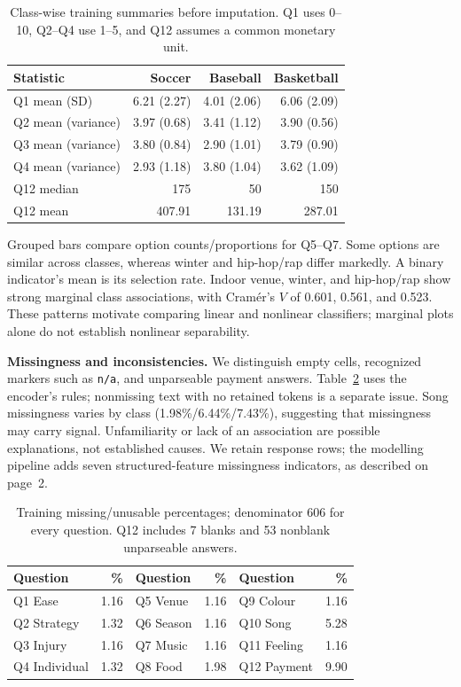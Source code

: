 \documentclass[10pt,letterpaper]{article}
\newcommand{\topic}[1]{\par\smallskip\textbf{#1}\quad}
\begin{document}
\begin{table}[ht]
\centering\small
\caption{Class-wise training summaries before imputation. Q1 uses 0--10,
Q2--Q4 use 1--5, and Q12 assumes a common monetary unit.}
\label{tab:numeric}
\begin{tabular}{lrrr}
\toprule
Statistic & Soccer & Baseball & Basketball\\
\midrule
Q1 mean (SD) & 6.21 (2.27) & 4.01 (2.06) & 6.06 (2.09)\\
Q2 mean (variance) & 3.97 (0.68) & 3.41 (1.12) & 3.90 (0.56)\\
Q3 mean (variance) & 3.80 (0.84) & 2.90 (1.01) & 3.79 (0.90)\\
Q4 mean (variance) & 2.93 (1.18) & 3.80 (1.04) & 3.62 (1.09)\\
Q12 median & 175 & 50 & 150\\
Q12 mean & 407.91 & 131.19 & 287.01\\
\bottomrule
\end{tabular}
\end{table}

Grouped bars compare option counts/proportions for Q5--Q7. Some options are
similar across classes, whereas winter and hip-hop/rap differ markedly.
A binary indicator's mean is its selection rate. Indoor venue, winter, and hip-hop/rap
show strong marginal class associations, with Cram\'er's $V$ of 0.601, 0.561,
and 0.523. These patterns motivate comparing linear and nonlinear classifiers;
marginal plots alone do not establish nonlinear separability.

\topic{Missingness and inconsistencies.}
We distinguish empty cells, recognized markers such as \texttt{n/a}, and
unparseable payment answers. Table~\ref{tab:missing} uses the encoder's rules;
nonmissing text with no retained tokens is a separate issue. Song missingness
varies by class (1.98\%/6.44\%/7.43\%), suggesting that missingness may carry
signal. Unfamiliarity or lack of an association are possible explanations, not
established causes. We retain response rows; the modelling pipeline adds seven
structured-feature missingness indicators, as described on page~2.

\begin{table}[ht]
\centering\small
\caption{Training missing/unusable percentages; denominator 606 for every question.
Q12 includes 7 blanks and 53 nonblank unparseable answers.}
\label{tab:missing}
\begin{tabular}{lrlrlr}
\toprule
Question & \% & Question & \% & Question & \%\\
\midrule
Q1 Ease & 1.16 & Q5 Venue & 1.16 & Q9 Colour & 1.16\\
Q2 Strategy & 1.32 & Q6 Season & 1.16 & Q10 Song & 5.28\\
Q3 Injury & 1.16 & Q7 Music & 1.16 & Q11 Feeling & 1.16\\
Q4 Individual & 1.32 & Q8 Food & 1.98 & Q12 Payment & 9.90\\
\bottomrule
\end{tabular}
\end{table}
\end{document}
